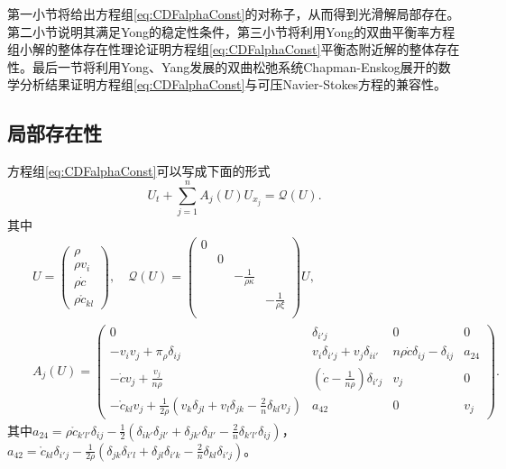	第一小节将给出方程组\eqref{eq:CDFalphaConst}的对称子，从而得到光滑解局部存在。第二小节说明其满足Yong的稳定性条件，第三小节将利用Yong的双曲平衡率方程组小解的整体存在性理论证明方程组\eqref{eq:CDFalphaConst}平衡态附近解的整体存在性\cite{yong2004entropy,kawashima2009decay}。最后一节将利用Yong、Yang发展的双曲松弛系统Chapman-Enskog展开的数学分析结果\cite{yang2015validity}证明方程组\eqref{eq:CDFalphaConst}与可压Navier-Stokes方程的兼容性。

	\subsection{局部存在性}
	方程组\eqref{eq:CDFalphaConst}可以写成下面的形式
	\begin{equation*}
		U_t + \sum_{j=1}^n A_j(U) U_{x_j} = \mathcal{Q}(U).
	\end{equation*}
	其中
	\begin{eqnarray*} 
		&& U =\left( \begin{array}{cccc} 
			\rho \\ \rho v_i \\ \rho \dot{c} \\ \rho \mathring{c}_{kl}
		\end{array}\right), \quad 
		\mathcal{Q}(U) = 
		\left( \begin{array}{cccc} 
			0 & & & \\
			& 0 & & \\
			& &  -\frac{1}{\rho \kappa} & \\
			& & & -\frac{1}{\rho\xi}  \\
 		\end{array}\right) U, \\%
	 		&&  A_{j}(U) =
 		\left( \begin{matrix} 
 		0 & \delta_{i'j} & 0 & 0  \\
 		-v_i v_j  + \pi_\rho \delta_{ij} & v_i \delta_{i'j} + v_j \delta_{ii'}   &  n \rho \dot{c} \delta_{ij} - \delta_{ij} & a_{24}  \\
 		-\dot{c} v_j + \frac{v_j}{n \rho} & (\dot{c} - \frac{1}{n \rho}) \delta_{i'j} &  v_j & 0 \\
 		-\mathring{c}_{kl} v_j + \frac{1}{2 \rho} (v_k \delta_{jl} + v_l \delta_{jk} - \frac{2}{n} \delta_{kl} v_j) & a_{42} & 0 & v_j 
 		\end{matrix} \right).
	\end{eqnarray*}
	其中$a_{24}=\rho \mathring{c}_{k'l'} \delta_{ij}- \frac{1}{2}(\delta_{ik'}\delta_{jl'} + \delta_{jk'}\delta_{il'} - \frac{2}{n} \delta_{k'l'} \delta_{ij})$，$a_{42} =  \mathring{c}_{kl} \delta_{i'j}  - \frac{1}{2\rho} (\delta_{jk} \delta_{i'l} +　\delta_{jl} \delta_{i'k} - \frac{2}{n} \delta_{kl} \delta_{i'j})$。


